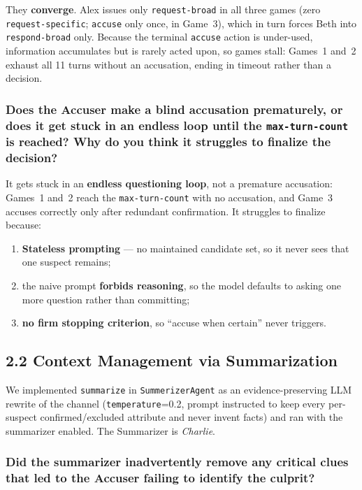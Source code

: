 \documentclass[11pt]{article}
\begin{document}
They \textbf{converge}. Alex issues only \texttt{request-broad} in all three games (zero
\texttt{request-specific}; \texttt{accuse} only once, in Game~3), which in turn forces Beth
into \texttt{respond-broad} only. Because the terminal \texttt{accuse} action is under-used,
information accumulates but is rarely acted upon, so games stall: Games~1 and~2 exhaust all
11 turns without an accusation, ending in timeout rather than a decision.

\subsubsection*{Does the Accuser make a blind accusation prematurely, or does it get stuck in
an endless loop until the \texttt{max-turn-count} is reached? Why do you think it struggles
to finalize the decision?}

It gets stuck in an \textbf{endless questioning loop}, not a premature accusation: Games~1
and~2 reach the \texttt{max-\allowbreak turn-\allowbreak count} with no accusation, and
Game~3 accuses correctly only after redundant confirmation. It struggles to finalize because:
\begin{enumerate}[leftmargin=1.6em,itemsep=2pt]
  \item \textbf{Stateless prompting} --- no maintained candidate set, so it never sees that
  one suspect remains;
  \item the naive prompt \textbf{forbids reasoning}, so the model defaults to asking one
  more question rather than committing;
  \item \textbf{no firm stopping criterion}, so ``accuse when certain'' never triggers.
\end{enumerate}

\subsection*{2.2 \quad Context Management via Summarization}

We implemented \texttt{summarize} in \texttt{SummerizerAgent} as an evidence-preserving LLM
rewrite of the channel (\texttt{temperature}=0.2, prompt instructed to keep every
per-suspect confirmed/excluded attribute and never invent facts) and ran with the summarizer
enabled. The Summarizer is \emph{Charlie}.

\subsubsection*{Did the summarizer inadvertently remove any critical clues that led to the
Accuser failing to identify the culprit?}
\end{document}
